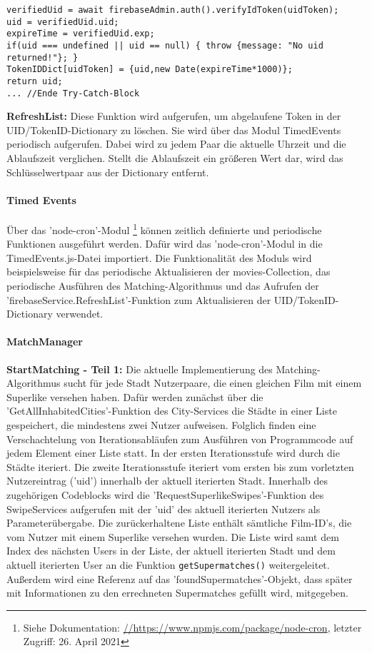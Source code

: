 \begin{lstlisting}[caption=Firebase-Service Register, label=lst:firebaseServiceRegister]
verifiedUid = await firebaseAdmin.auth().verifyIdToken(uidToken);
uid = verifiedUid.uid;
expireTime = verifiedUid.exp;
if(uid === undefined || uid == null) { throw {message: "No uid returned!"}; }
TokenIDDict[uidToken] = {uid,new Date(expireTime*1000)};
return uid;
... //Ende Try-Catch-Block
\end{lstlisting}
   
\noindent
\textbf{RefreshList:}
Diese Funktion wird aufgerufen, um abgelaufene Token in der UID/TokenID-Dictionary zu löschen. Sie wird über das Modul TimedEvents periodisch aufgerufen. Dabei wird zu jedem Paar die aktuelle Uhrzeit und die Ablaufszeit verglichen. Stellt die Ablaufszeit ein größeren Wert dar, wird das Schlüsselwertpaar aus der Dictionary entfernt.\\

\paragraph{Timed Events}
Über das 'node-cron'-Modul \footnote{Siehe Dokumentation: \url{//https://www.npmjs.com/package/node-cron}, letzter Zugriff: 26. April 2021}
können zeitlich definierte und periodische Funktionen ausgeführt werden. Dafür wird das 'node-cron'-Modul in die TimedEvents.js-Datei importiert. Die Funktionalität des Moduls wird beispielsweise für das periodische Aktualisieren der movies-Collection, das periodische Ausführen des Matching-Algorithmus und das Aufrufen der 'firebaseService.RefreshList'-Funktion zum Aktualisieren der UID/TokenID-Dictionary verwendet.\\

\paragraph{MatchManager}
\noindent
\textbf{StartMatching - Teil 1:}
Die aktuelle Implementierung des Matching-Algorithmus sucht für jede Stadt Nutzerpaare, die einen gleichen Film mit einem Superlike versehen haben. Dafür werden zunächst über die 'GetAllInhabitedCities'-Funktion des City-Services die Städte in einer Liste gespeichert, die mindestens zwei Nutzer aufweisen. Folglich finden eine Verschachtelung von Iterationsabläufen zum Ausführen von Programmcode auf jedem Element einer Liste statt.
In der ersten Iterationsstufe wird durch die Städte iteriert.
Die zweite Iterationsstufe iteriert vom ersten bis zum vorletzten Nutzereintrag ('uid') innerhalb der aktuell iterierten Stadt. Innerhalb des zugehörigen Codeblocks wird die 'RequestSuperlikeSwipes'-Funktion des SwipeServices aufgerufen mit der 'uid' des aktuell iterierten Nutzers als Parameterübergabe. Die zurückerhaltene Liste enthält sämtliche Film-ID's, die vom Nutzer mit einem Superlike versehen wurden. Die Liste wird samt dem Index des nächsten Users in der Liste, der aktuell iterierten Stadt und dem aktuell iterierten User an die Funktion \texttt{getSupermatches()} weitergeleitet. Außerdem wird eine Referenz auf das 'foundSupermatches'-Objekt, dass später mit Informationen zu den errechneten Supermatches gefüllt wird, mitgegeben.\\

